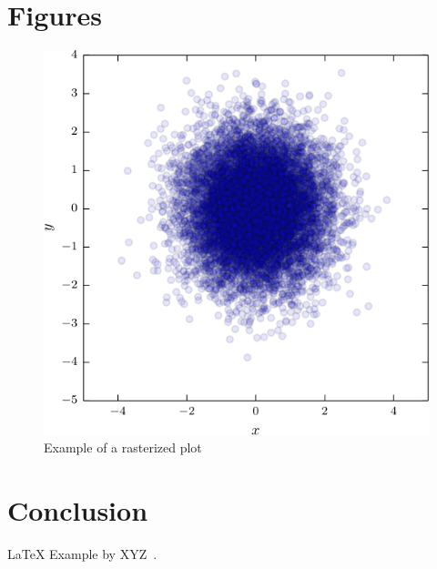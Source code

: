 \section{Figures}\label{sec:fig}

\begin{figure}[H]
	\centering
	\includegraphics[width=0.9\columnwidth]{assets/figure_rasterized.pdf}
	\caption{Example of a rasterized plot}
\end{figure}

\lipsum[6] %

\section{Conclusion}\label{sec:conclusion}

\lipsum[7] %
\LaTeX{} Example by XYZ~\cite{doe2006test}.
